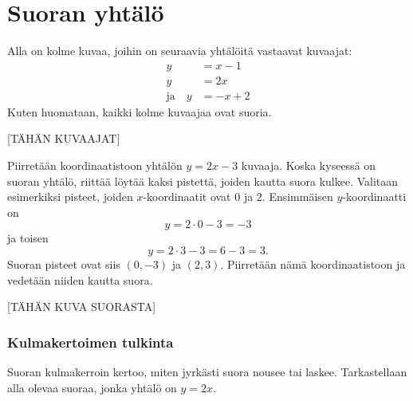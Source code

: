 \section{Suoran yhtälö}


Alla on kolme kuvaa, joihin on seuraavia yhtälöitä vastaavat kuvaajat:
\begin{align*}
y & =x-1 \\
y & =2x \\
\text{ja} \quad y & =-x+2
\end{align*}
Kuten huomataan, kaikki kolme kuvaajaa ovat suoria.

[TÄHÄN KUVAAJAT]


\begin{esimerkki} Piirretään koordinaatistoon yhtälön $y=2x-3$ kuvaaja. Koska kyseessä on suoran yhtälö, riittää löytää kaksi pistettä, joiden kautta suora kulkee.
Valitaan esimerkiksi pisteet, joiden $x$-koordinaatit ovat $0$ ja $2$. Ensimmäisen $y$-koordinaatti on
\[
y=2\cdot 0-3=-3
\]
ja toisen
\[
y=2\cdot 3-3=6-3=3.
\]
Suoran pisteet ovat siis $(0,-3)$ ja $(2,3)$. Piirretään nämä koordinaatistoon ja vedetään niiden kautta suora.

[TÄHÄN KUVA SUORASTA]
\end{esimerkki}

\subsubsection*{Kulmakertoimen tulkinta}

Suoran kulmakerroin kertoo, miten jyrkästi suora nousee tai laskee. Tarkastellaan alla olevaa suoraa, jonka yhtälö on $y=2x$.

